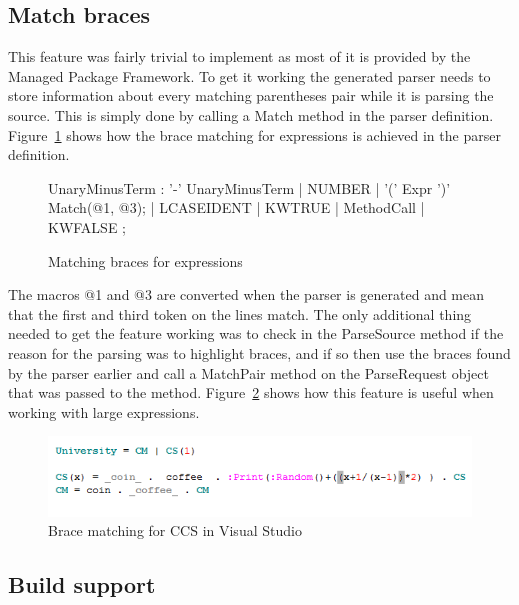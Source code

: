 	\subsection{Match braces}
	
	This feature was fairly trivial to implement as most of it is provided by 
	the Managed Package Framework. To get it working the generated parser needs 
	to store information about every matching parentheses pair while it is 
	parsing the source. This is simply done by calling a \textsf{Match} method 
	in the parser definition. Figure~\ref{fig:matchbrace} shows how the brace 
	matching for expressions is achieved in the parser definition.

\begin{figure}
\begin{code}	
UnaryMinusTerm
    : '-' UnaryMinusTerm
    | NUMBER
    | '(' Expr ')'  { Match(@1, @3); }
    | LCASEIDENT
    | KWTRUE
    | MethodCall
    | KWFALSE
    ;
\end{code}
\caption{Matching braces for expressions}
\label{fig:matchbrace}
\end{figure}

	The macros @1 and @3 are converted when the parser is generated and mean 
	that the first and third token on the lines match. The only additional thing 
	needed to get the feature working was to check in the \textsf{ParseSource} 
	method if the reason for the parsing was to highlight braces, and if so then 
	use the braces found by the parser earlier and call a \textsf{MatchPair} 
	method on the \textsf{ParseRequest} object that was passed to the method. 
	Figure~\ref{fig:matchbraces} shows how this feature is useful when working 
	with large expressions.
	
	\begin{figure}[h!]
		\centering
		\includegraphics[scale=0.75]{matchbraces.png}
		\caption{Brace matching for CCS in Visual Studio}
		\label{fig:matchbraces}
	\end{figure}
		
	
	\subsection{Build support}\label{msbuild}
	
